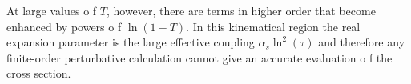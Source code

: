 \documentclass[../main.tex]{subfiles}
\begin{document}
At large values o f $T$, however, there are terms in higher order that become enhanced by powers o f $\ln(1 - T)$.
In this kinematical region the real expansion parameter is the
large effective coupling $\alpha_s \ln^2(\tau)$ and therefore
any finite-order perturbative calculation cannot give an accurate evaluation o f the cross section.
\end{document}
